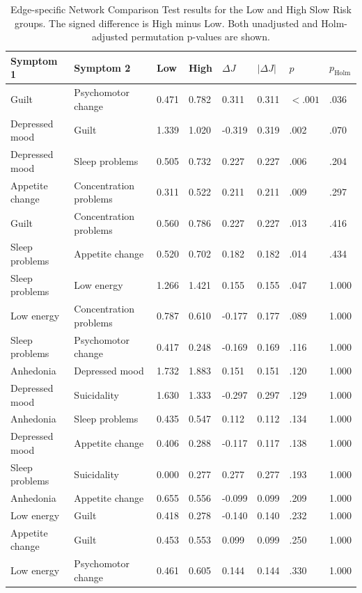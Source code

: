 
\begin{longtable}[t]{llllllll}
\caption{\label{tab:tab:appendix_nct_edges}Edge-specific Network Comparison Test results for the Low and High Slow Risk groups. The signed difference is High minus Low. Both unadjusted and Holm-adjusted permutation p-values are shown.}\\
\toprule
Symptom 1 & Symptom 2 & Low & High & $\Delta J$ & $|\Delta J|$ & $p$ & $p_{\mathrm{Holm}}$\\
\midrule
Guilt & Psychomotor change & 0.471 & 0.782 & 0.311 & 0.311 & $<.001$ & .036\\
Depressed mood & Guilt & 1.339 & 1.020 & -0.319 & 0.319 & .002 & .070\\
Depressed mood & Sleep problems & 0.505 & 0.732 & 0.227 & 0.227 & .006 & .204\\
Appetite change & Concentration problems & 0.311 & 0.522 & 0.211 & 0.211 & .009 & .297\\
Guilt & Concentration problems & 0.560 & 0.786 & 0.227 & 0.227 & .013 & .416\\
Sleep problems & Appetite change & 0.520 & 0.702 & 0.182 & 0.182 & .014 & .434\\
Sleep problems & Low energy & 1.266 & 1.421 & 0.155 & 0.155 & .047 & 1.000\\
Low energy & Concentration problems & 0.787 & 0.610 & -0.177 & 0.177 & .089 & 1.000\\
Sleep problems & Psychomotor change & 0.417 & 0.248 & -0.169 & 0.169 & .116 & 1.000\\
Anhedonia & Depressed mood & 1.732 & 1.883 & 0.151 & 0.151 & .120 & 1.000\\
Depressed mood & Suicidality & 1.630 & 1.333 & -0.297 & 0.297 & .129 & 1.000\\
Anhedonia & Sleep problems & 0.435 & 0.547 & 0.112 & 0.112 & .134 & 1.000\\
Depressed mood & Appetite change & 0.406 & 0.288 & -0.117 & 0.117 & .138 & 1.000\\
Sleep problems & Suicidality & 0.000 & 0.277 & 0.277 & 0.277 & .193 & 1.000\\
Anhedonia & Appetite change & 0.655 & 0.556 & -0.099 & 0.099 & .209 & 1.000\\
Low energy & Guilt & 0.418 & 0.278 & -0.140 & 0.140 & .232 & 1.000\\
Appetite change & Guilt & 0.453 & 0.553 & 0.099 & 0.099 & .250 & 1.000\\
Low energy & Psychomotor change & 0.461 & 0.605 & 0.144 & 0.144 & .330 & 1.000\\

\end{longtable}

